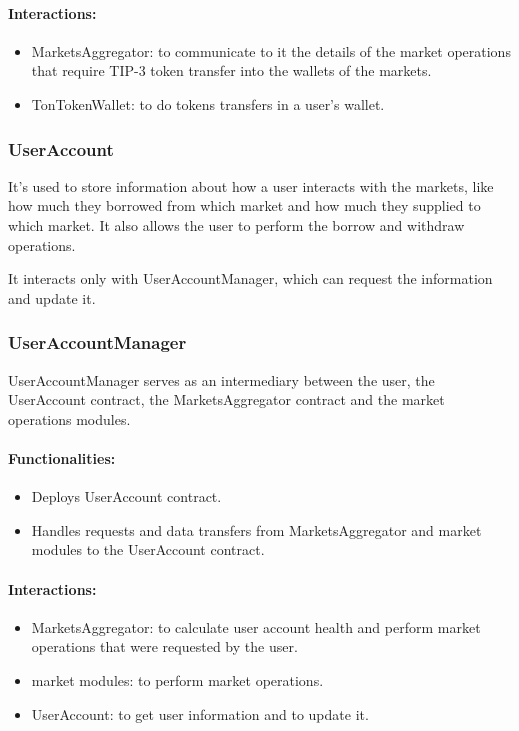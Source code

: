 \paragraph*{Interactions:}
\begin{itemize}
  \item MarketsAggregator: to communicate to it the details of the market operations that require TIP-3 token transfer into the wallets of the markets.
  \item TonTokenWallet: to do tokens transfers in a user's wallet.
\end{itemize}

\subsubsection{UserAccount}

It's used to store information about how a user interacts with the markets, like how much they borrowed from which market and how much they supplied to which market. It also allows the user to perform the borrow and withdraw operations.

It interacts only with UserAccountManager, which can request the information and update it.

\subsubsection{UserAccountManager}

UserAccountManager serves as an intermediary between the user, the UserAccount contract, the MarketsAggregator contract and the market operations modules.

\paragraph*{Functionalities:}
\begin{itemize}
  \item Deploys UserAccount contract.
  \item Handles requests and data transfers from MarketsAggregator and market modules to the UserAccount contract.
\end{itemize}

\paragraph*{Interactions:}
\begin{itemize}
  \item MarketsAggregator: to calculate user account health and perform market operations that were requested by the user.
  \item market modules: to perform market operations.
  \item UserAccount: to get user information and to update it.
\end{itemize}

